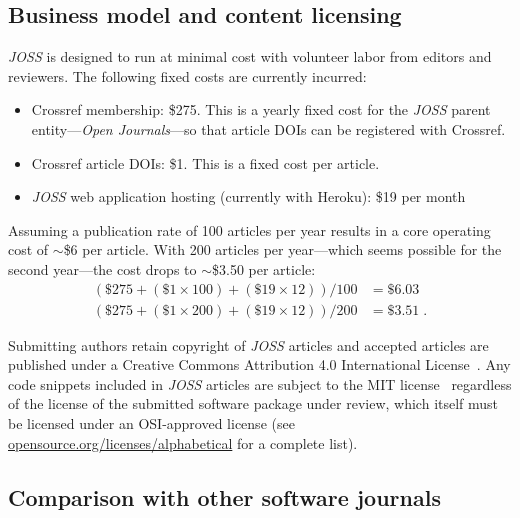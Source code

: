 \documentclass{article}
\newcommand\joss{\textit{JOSS}}
\begin{document}
\subsection{Business model and content licensing}

\joss{} is designed to run at minimal cost with volunteer labor from editors and reviewers. The following fixed costs are currently incurred:

\begin{itemize}
  \item{Crossref membership: \$275. This is a yearly fixed cost for the \joss{} parent entity---\textit{Open Journals}---so that article DOIs can be registered with Crossref.}
  \item{Crossref article DOIs: \$1. This is a fixed cost per article.}
  \item{\joss{} web application hosting (currently with Heroku): \$19 per month}
\end{itemize}

Assuming a publication rate of 100 articles per year results in a core operating cost of $\sim$\$6 per article.
With 200 articles per year---which seems possible for the second
year---the cost drops to $\sim$\$3.50 per article:
\begin{align}\label{costs}
(\$275 + (\$1 \times 100) + (\$19 \times 12)) / 100 &= \$6.03 \\
(\$275 + (\$1 \times 200) + (\$19 \times 12)) / 200 &= \$3.51 \;.
\end{align}

Submitting authors retain copyright of \joss{} articles and accepted articles are published under a Creative Commons Attribution 4.0 International License~\cite{cc}.
Any code snippets included in \joss{} articles are subject to the MIT license~\cite{mit} regardless of the license of the submitted software package under review, which itself must be licensed under an OSI-approved license (see \href{https://opensource.org/licenses/alphabetical}{opensource.org/licenses/alphabetical} for a complete list).


\subsection{Comparison with other software journals}
\label{comparison}
\end{document}
